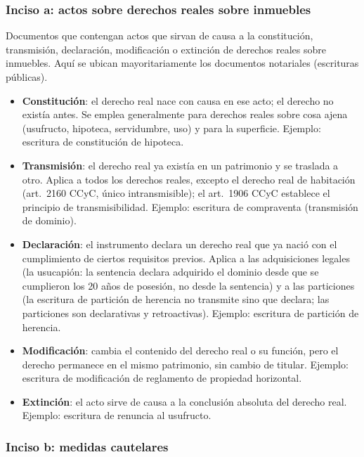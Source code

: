 \documentclass[12pt,oneside]{book}
\begin{document}
\subsubsection{Inciso a: actos sobre derechos reales sobre inmuebles}

Documentos que contengan actos que sirvan de causa a la constitución, transmisión, declaración, modificación o extinción de derechos reales sobre inmuebles. Aquí se ubican mayoritariamente los documentos notariales (escrituras públicas).

\begin{itemize}
    \item \textbf{Constitución}: el derecho real nace con causa en ese acto; el derecho no existía antes. Se emplea generalmente para derechos reales sobre cosa ajena (usufructo, hipoteca, servidumbre, uso) y para la superficie. Ejemplo: escritura de constitución de hipoteca.
    \item \textbf{Transmisión}: el derecho real ya existía en un patrimonio y se traslada a otro. Aplica a todos los derechos reales, excepto el derecho real de habitación (art.\ 2160 CCyC, único intransmisible); el art.\ 1906 CCyC establece el principio de transmisibilidad. Ejemplo: escritura de compraventa (transmisión de dominio).
    \item \textbf{Declaración}: el instrumento declara un derecho real que ya nació con el cumplimiento de ciertos requisitos previos. Aplica a las adquisiciones legales (la usucapión: la sentencia declara adquirido el dominio desde que se cumplieron los 20 años de posesión, no desde la sentencia) y a las particiones (la escritura de partición de herencia no transmite sino que declara; las particiones son declarativas y retroactivas). Ejemplo: escritura de partición de herencia.
    \item \textbf{Modificación}: cambia el contenido del derecho real o su función, pero el derecho permanece en el mismo patrimonio, sin cambio de titular. Ejemplo: escritura de modificación de reglamento de propiedad horizontal.
    \item \textbf{Extinción}: el acto sirve de causa a la conclusión absoluta del derecho real. Ejemplo: escritura de renuncia al usufructo.
\end{itemize}

\subsubsection{Inciso b: medidas cautelares}
\end{document}
